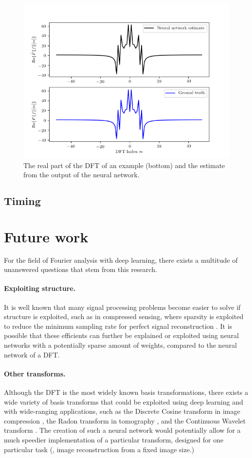 \documentclass[12pt]{article}
\begin{document}
\begin{figure}
\centering
\includegraphics[scale=.75]{figures/DFT_comparisons.png}
\caption{The real part of the DFT of an example (bottom) and the estimate from the output of the neural network.}
\label{f-DFT_compare}
\end{figure}

\subsection{Timing}

\section{Future work}
For the field of Fourier analysis with deep learning, there exists a multitude of unanswered questions that stem from 
this research.

\paragraph{Exploiting structure.} It is well known that many signal processing problems become easier to solve if structure is
exploited, such as in compressed sensing, where sparsity is exploited to reduce the minimum sampling rate for perfect signal
reconstruction \cite{D:06}. It is possible that these efficients can further be explained or exploited using neural networks
with a potentially sparse amount of weights, compared to the neural network of a DFT.

\paragraph{Other transforms.} Although the DFT is the most widely known basis transformations, there exists a wide variety of
basis transforms that could be exploited using deep learning and with wide-ranging applications, such as the Discrete
Cosine transform in image compression \cite{ANR:74,YL:95}, the Radon transform in tomography \cite{D:07}, and the Continuous 
Wavelet transform \cite{M:08}. The creation of such a neural network would potentially allow for a much speedier implementation 
of a particular transform, designed for one particular task (\eg, image reconstruction from a fixed image size.)
\end{document}
